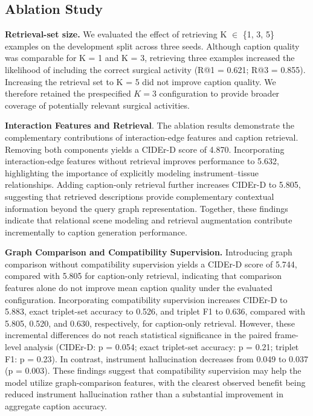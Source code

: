 \documentclass[11pt]{article}
\begin{document}
\subsection{Ablation Study}\label{subsec5.2}

\textbf{Retrieval-set size.} We evaluated the effect of retrieving K $\in$ \{1, 3, 5\} examples on the development split across three seeds. Although caption quality was comparable for K = 1 and K = 3, retrieving three examples increased the likelihood of including the correct surgical activity (R@1 = 0.621; R@3 = 0.855). Increasing the retrieval set to K = 5 did not improve caption quality. We therefore retained the prespecified $K=3$ configuration to provide broader coverage of potentially relevant surgical activities.

\textbf{Interaction Features and Retrieval}. The ablation results demonstrate the complementary contributions of interaction-edge features and caption retrieval. Removing both components yields a CIDEr-D score of 4.870. Incorporating interaction-edge features without retrieval improves performance to 5.632, highlighting the importance of explicitly modeling instrument--tissue relationships. Adding caption-only retrieval further increases CIDEr-D to 5.805, suggesting that retrieved descriptions provide complementary contextual information beyond the query graph representation. Together, these findings indicate that relational scene modeling and retrieval augmentation contribute incrementally to caption generation performance.

\textbf{Graph Comparison and Compatibility Supervision.} Introducing graph comparison without compatibility supervision yields a CIDEr-D score of 5.744, compared with 5.805 for caption-only retrieval, indicating that comparison features alone do not improve mean caption quality under the evaluated configuration. Incorporating compatibility supervision increases CIDEr-D to 5.883, exact triplet-set accuracy to 0.526, and triplet F1 to 0.636, compared with 5.805, 0.520, and 0.630, respectively, for caption-only retrieval. However, these incremental differences do not reach statistical significance in the paired frame-level analysis (CIDEr-D: p = 0.054; exact triplet-set accuracy: p = 0.21; triplet F1: p = 0.23). In contrast, instrument hallucination decreases from 0.049 to 0.037 (p = 0.003). These findings suggest that compatibility supervision may help the model utilize graph-comparison features, with the clearest observed benefit being reduced instrument hallucination rather than a substantial improvement in aggregate caption accuracy.
\end{document}
